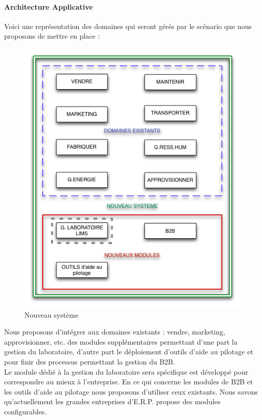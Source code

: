 \paragraph{Architecture Applicative}
Voici une représentation des domaines qui seront gérés par le scénario que nous proposons de mettre en place :
\begin{figure}[H]
\begin{center}
 \includegraphics[scale=0.5]{ERPsolution.png}
  \caption{Nouveau système}
\end{center}  
\end{figure}

Nous proposons d'intégrer aux domaines existants : vendre, marketing, approvisionner, etc.  des modules supplémentaires permettant d'une part la gestion du laboratoire, d'autre part le déploiement d'outils d'aide au pilotage et pour finir des processus permettant la gestion du B2B.\\
Le module dédié à la gestion du laboratoire sera spécifique est développé pour correspondre au mieux à l'entreprise. En ce qui concerne les modules de B2B et les outils d'aide au pilotage nous proposons d'utiliser ceux existants. Nous savons qu'actuellement les grandes entreprises d'E.R.P. propose des modules configurables.   
